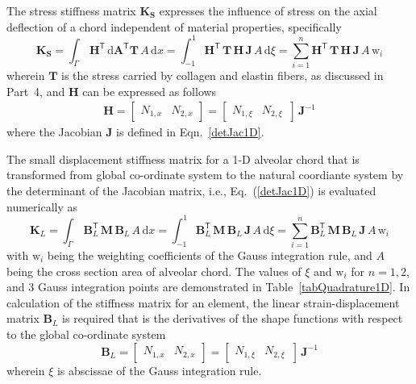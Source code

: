 The stress stiffness matrix $\mathbf{K}_\mathbf{S}$ expresses the influence of stress on the axial deflection of a chord independent of material properties, specifically
\begin{equation}
\mathbf{K}_\mathbf{S} = \int_{\Gamma} \, \mathbf{H}^{\mathsf{T}} \, \mathrm{d} \mathbf{A}^{\mathsf{T}} \mathbf{T} \, A \, \mathrm{d} x 
= \int_{-1}^{1} \mathbf{H}^{\mathsf{T}} \,  \mathbf{T} \, \mathbf{H} \, \mathbf{J}  \, A \,  \mathrm{d} \xi
 = \sum_{i=1}^{n}  \mathbf{H}^{\mathsf{T}} \, \mathbf{T} \, \mathbf{H}  \, \mathbf{J} \, A \, \mathrm{w}_i
\end{equation}
wherein $\mathbf{T}$ is the stress carried by collagen and elastin fibers, as discussed in Part~4, and $\mathbf{H}$ can be expressed as follows
\begin{equation}
\begin{aligned}
\mathbf{H} = \begin{bmatrix}
 N_{1,x} &  N_{2,x}
\end{bmatrix} = \begin{bmatrix}
 N_{1,\xi} & N_{2,\xi} \, 
\end{bmatrix} \, \mathbf{J}^{-1}
\end{aligned}
\end{equation}
where the Jacobian $\mathbf{J}$ is defined in Eqn.~\ref{detJac1D}.

The small displacement stiffness matrix for a 1-D alveolar chord that is transformed from global co-ordinate system to the natural coordiante system by the determinant of the Jacobian matrix, i.e., Eq.~(\ref{detJac1D}) is evaluated numerically as 
\begin{equation}
\mathbf{K}_{L} = \int_{\Gamma} \, \mathbf{B}_L^{\mathsf{T}} \, \mathbf{M} \, \mathbf{B}_L \, A \, \mathrm{d} x  = \int_{-1}^{1} \mathbf{B}_L^{\mathsf{T}} \, \mathbf{M} \, \mathbf{B}_L \, \mathbf{J}  \, A \,  \mathrm{d} \xi =  \sum_{i=1}^{n}  \mathbf{B}_L^{\mathsf{T}} \, \mathbf{M} \, \mathbf{B}_L \, \mathbf{J} \, A \, \mathrm{w}_i
\end{equation}
with $\mathrm{w}_i$ being the  weighting coefficients of the Gauss integration rule, and $A$ being the cross section area of alveolar chord. The values of $\xi$ and $\mathrm{w}_i$ for $n = 1, 2$, and $3$ Gauss integration points are demonstrated in Table~\ref{tabQuadrature1D}.
In calculation of the stiffness matrix for an element, the linear strain-displacement matrix $\mathbf{B}_L$ is required that is the derivatives of the shape functions with respect to the global co-ordinate system  
\begin{equation}
\mathbf{B}_L = \begin{bmatrix}
 N_{1,x} &   N_{2,x}
\end{bmatrix} = \begin{bmatrix}
 N_{1,\xi} &   N_{2,\xi} \, 
\end{bmatrix} \, \mathbf{J}^{-1}
\end{equation}
wherein $\xi$ is abscissae of the Gauss integration rule. 

